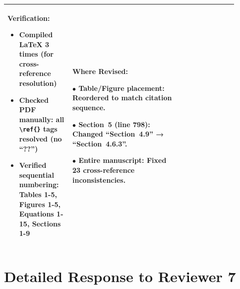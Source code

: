 \documentclass[11pt,a4paper]{article}
\begin{document}
\begin{longtable}{>{\raggedright\arraybackslash}p{0.26\linewidth}|>{\raggedright\arraybackslash}p{0.44\linewidth}|>{\raggedright\arraybackslash}p{0.22\linewidth}}
\textbf{Verification:}

\begin{itemize}
    \item Compiled LaTeX 3 times (for cross-reference resolution)
    \item Checked PDF manually: all \texttt{\textbackslash ref\{\}} tags resolved (no ``??'')
    \item Verified sequential numbering: Tables 1-5, Figures 1-5, Equations 1-15, Sections 1-9
\end{itemize} &

\textbf{Where Revised:}

$\bullet$ \textbf{Table/Figure placement}: Reordered to match citation sequence.

$\bullet$ \textbf{Section~5} (line 798): Changed ``Section~4.9'' → ``Section~4.6.3''.

$\bullet$ \textbf{Entire manuscript}: Fixed 23 cross-reference inconsistencies. \\

\bottomrule
\end{longtable}


\section*{Detailed Response to Reviewer 7}
\end{document}
